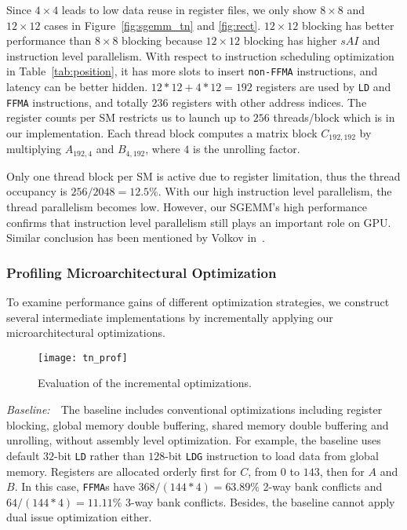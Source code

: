 Since $4\times 4$ leads to low data reuse in register files, we only show $8\times8$ and $12\times12$ cases in Figure~\ref{fig:sgemm_tn} and \ref{fig:rect}.
$12\times12$ blocking has better performance than $8\times8$ blocking because $12\times12$ blocking has higher $sAI$ and instruction level parallelism. 
With respect to instruction scheduling optimization in Table~\ref{tab:position}, it has more slots to insert {\tt non-FFMA} instructions, and latency can be better hidden.
$12*12+4*12=192$ registers are used by {\tt LD} and {\tt FFMA} instructions, and totally $236$ registers with other address indices. 
The register counts per SM restricts us to launch up to $256$ threads/block which is in our implementation. 
Each thread block computes a matrix block $C_{192, 192}$ by multiplying $A_{192,4}$ and $B_{4, 192}$, where $4$ is the unrolling factor.


Only one thread block per SM is active due to register limitation, thus the thread occupancy is $256/2048=12.5\%$.
With our high instruction level parallelism, the thread parallelism becomes low.
However, our SGEMM's high performance confirms that instruction level parallelism still plays an important role on GPU.
Similar conclusion has been mentioned by Volkov in~\cite{volkov2010better}.

\subsubsection{Profiling Microarchitectural Optimization}

To examine performance gains of different optimization strategies, we construct several intermediate 
implementations by incrementally applying our microarchitectural optimizations.
\begin{figure}[htbp]
\begin{center}
\texttt{[image: tn\_prof]}
    \caption{Evaluation of the incremental optimizations.}
\label{fig:th_prof}
\end{center}
\end{figure}

{\it Baseline:}~~The baseline includes conventional optimizations including register blocking, global
memory double buffering, shared memory double buffering and unrolling, without assembly level optimization.
For example, the baseline uses default $32$-bit {\tt LD} rather than $128$-bit {\tt LDG} instruction to load data from global memory.
Registers are allocated orderly first for $C$, from $0$ to $143$, then for $A$ and $B$. 
In this case, {\tt FFMA}s have $368/(144*4)=63.89\%$ 2-way bank conflicts and $64/(144*4)=11.11\%$ 3-way bank conflicts. 
Besides, the baseline cannot apply dual issue optimization either.

